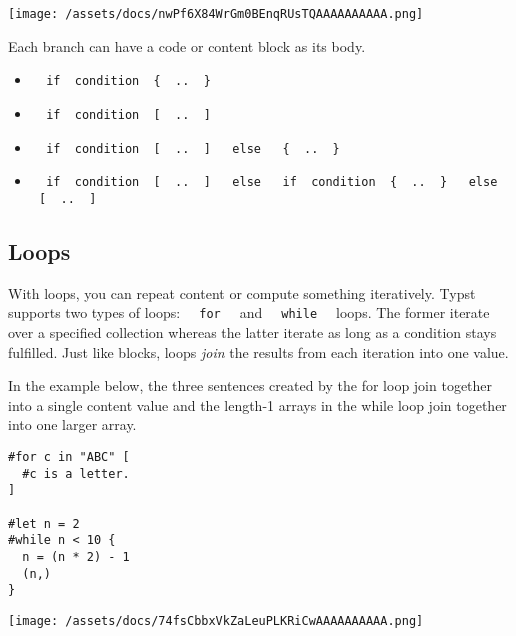 \texttt{[image: /assets/docs/nwPf6X84WrGm0BEnqRUsTQAAAAAAAAAA.png]}

Each branch can have a code or content block as its body.

\begin{itemize}
\tightlist
\item
  \texttt{\ }{\texttt{\ if\ }}\texttt{\ condition\ }{\texttt{\ \{\ }}\texttt{\ ..\ }{\texttt{\ \}\ }}\texttt{\ }
\item
  \texttt{\ }{\texttt{\ if\ }}\texttt{\ condition\ }{\texttt{\ {[}\ }}\texttt{\ ..\ }{\texttt{\ {]}\ }}\texttt{\ }
\item
  \texttt{\ }{\texttt{\ if\ }}\texttt{\ condition\ }{\texttt{\ {[}\ }}\texttt{\ ..\ }{\texttt{\ {]}\ }}\texttt{\ }{\texttt{\ else\ }}\texttt{\ }{\texttt{\ \{\ }}\texttt{\ ..\ }{\texttt{\ \}\ }}\texttt{\ }
\item
  \texttt{\ }{\texttt{\ if\ }}\texttt{\ condition\ }{\texttt{\ {[}\ }}\texttt{\ ..\ }{\texttt{\ {]}\ }}\texttt{\ }{\texttt{\ else\ }}\texttt{\ }{\texttt{\ if\ }}\texttt{\ condition\ }{\texttt{\ \{\ }}\texttt{\ ..\ }{\texttt{\ \}\ }}\texttt{\ }{\texttt{\ else\ }}\texttt{\ }{\texttt{\ {[}\ }}\texttt{\ ..\ }{\texttt{\ {]}\ }}\texttt{\ }
\end{itemize}

\subsection{Loops}\label{loops}

With loops, you can repeat content or compute something iteratively.
Typst supports two types of loops:
\texttt{\ }{\texttt{\ for\ }}\texttt{\ } and
\texttt{\ }{\texttt{\ while\ }}\texttt{\ } loops. The former iterate
over a specified collection whereas the latter iterate as long as a
condition stays fulfilled. Just like blocks, loops \emph{join} the
results from each iteration into one value.

In the example below, the three sentences created by the for loop join
together into a single content value and the length-1 arrays in the
while loop join together into one larger array.

\begin{verbatim}
#for c in "ABC" [
  #c is a letter.
]

#let n = 2
#while n < 10 {
  n = (n * 2) - 1
  (n,)
}
\end{verbatim}

\texttt{[image: /assets/docs/74fsCbbxVkZaLeuPLKRiCwAAAAAAAAAA.png]}

